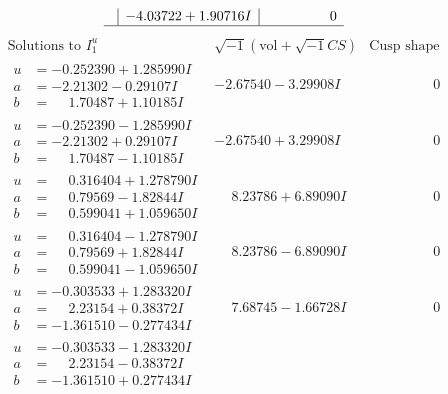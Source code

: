 \documentclass[1p]{elsarticle_modified}
\theoremstyle{definition}
\newcommand{\I}{\sqrt{-1}}
\begin{document}
$$\begin{array}{c|c|c}
 & -4.03722 + 1.90716 I & \phantom{-0.000000 } 0\\
 \hline 
 \end{array}$$\newpage$$\begin{array}{c|c|c}  
\text{Solutions to }I^u_{1}& \I (\text{vol} + \sqrt{-1}CS) & \text{Cusp shape}\\
 \hline 
\begin{aligned}
u &= -0.252390 + 1.285990 I \\
a &= -2.21302 - 0.29107 I \\
b &= \phantom{-}1.70487 + 1.10185 I\end{aligned}
 & -2.67540 - 3.29908 I & \phantom{-0.000000 } 0 \\ \hline\begin{aligned}
u &= -0.252390 - 1.285990 I \\
a &= -2.21302 + 0.29107 I \\
b &= \phantom{-}1.70487 - 1.10185 I\end{aligned}
 & -2.67540 + 3.29908 I & \phantom{-0.000000 } 0 \\ \hline\begin{aligned}
u &= \phantom{-}0.316404 + 1.278790 I \\
a &= \phantom{-}0.79569 - 1.82844 I \\
b &= \phantom{-}0.599041 + 1.059650 I\end{aligned}
 & \phantom{-}8.23786 + 6.89090 I & \phantom{-0.000000 } 0 \\ \hline\begin{aligned}
u &= \phantom{-}0.316404 - 1.278790 I \\
a &= \phantom{-}0.79569 + 1.82844 I \\
b &= \phantom{-}0.599041 - 1.059650 I\end{aligned}
 & \phantom{-}8.23786 - 6.89090 I & \phantom{-0.000000 } 0 \\ \hline\begin{aligned}
u &= -0.303533 + 1.283320 I \\
a &= \phantom{-}2.23154 + 0.38372 I \\
b &= -1.361510 - 0.277434 I\end{aligned}
 & \phantom{-}7.68745 - 1.66728 I & \phantom{-0.000000 } 0 \\ \hline\begin{aligned}
u &= -0.303533 - 1.283320 I \\
a &= \phantom{-}2.23154 - 0.38372 I \\
b &= -1.361510 + 0.277434 I\end{aligned}

\end{array}$$
\end{document}
